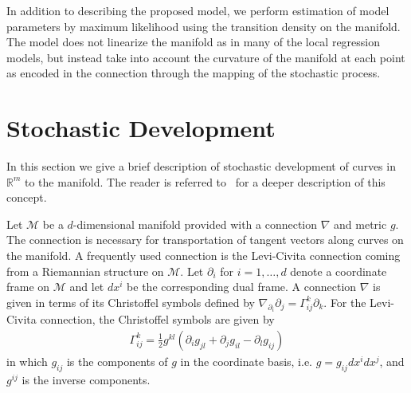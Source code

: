 \documentclass[runningheads,a4paper]{llncs}
\newcommand{\R}{\mathbb R}
\newcommand{\M}{\mathcal{M}}
\begin{document}

 In addition to describing the proposed model, we perform estimation of model parameters by maximum likelihood using the transition density on the manifold. The model does not linearize the manifold as in many of the local regression models, but instead take into account the curvature of the manifold at each point as encoded in the connection through the mapping of the stochastic process.

\section{Stochastic Development}
\label{sec:dev}

In this section we give a brief description of stochastic development of curves in $\R^m$ to the manifold. The reader is referred to~\cite{hsu_stocAnMan,sommer_anisotropically_2016,sommer_modelling_2016} for a deeper description of this concept.

 Let $\mathcal{M}$ be a $d$-dimensional manifold provided with a connection $\nabla$ and metric $g$. The connection is necessary for transportation of tangent vectors along curves on the manifold. A frequently used connection is the Levi-Civita connection coming from a Riemannian structure on $\M$. Let $\partial_i$ for $i=1,\ldots,d$ denote a coordinate frame on $\M$ and let $dx^i$ be the corresponding dual frame. A connection $\nabla$ is given in terms of its Christoffel symbols defined by $\nabla_{\partial_i} \partial_j = \Gamma_{ij}^k \partial_k$. For the Levi-Civita connection, the Christoffel symbols are given by
\begin{align}
    \Gamma_{ij}^k = \frac{1}{2}g^{kl}(\partial_i g_{jl} + \partial_j g_{il} - \partial_l g_{ij})
\label{eq:Chris}
\end{align}
in which $g_{ij}$ is the components of $g$ in the coordinate basis, i.e. $g = g_{ij}dx^idx^j$, and $g^{ij}$ is the inverse components.
\end{document}
